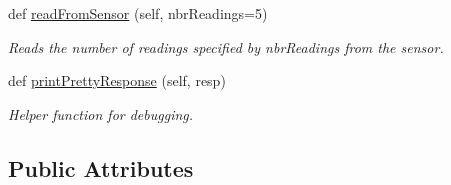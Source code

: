\begin{DoxyCompactItemize}
def \mbox{\hyperlink{class_sensor_app_1_1_sensor_app_aae2bb034ebfed964fa17fef43dddc8da}{read\+From\+Sensor}} (self, nbr\+Readings=5)
\begin{DoxyCompactList}\small\item\em Reads the number of readings specified by nbr\+Readings from the sensor. \end{DoxyCompactList}\item 
def \mbox{\hyperlink{class_sensor_app_1_1_sensor_app_a71471ab0e8fd7c112008232d21282df5}{print\+Pretty\+Response}} (self, resp)
\begin{DoxyCompactList}\small\item\em Helper function for debugging. \end{DoxyCompactList}\end{DoxyCompactItemize}
\subsection*{Public Attributes}
